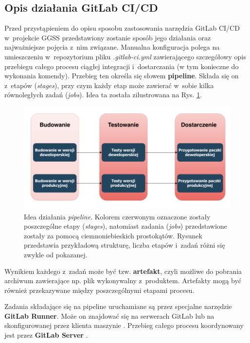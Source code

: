 \subsection{Opis działania GitLab CI/CD}
Przed przystąpieniem do opisu sposobu zastosowania narzędzia GitLab CI/CD w~projekcie GGSS przedstawiony zostanie sposób jego działania oraz najważniejsze pojęcia z~nim związane. Manualna konfiguracja polega na umieszczeniu w~repozytorium pliku \textit{.gitlab-ci.yml} zawierającego szczegółowy opis przebiegu całego procesu ciągłej integracji i~dostarczania (w tym konieczne do wykonania komendy). Przebieg ten określa się słowem \textbf{pipeline}. Składa się on z~etapów (\textit{stages}), przy czym każdy etap może zawierać w~sobie kilka równoległych zadań (\textit{jobs}). Idea ta została zilustrowana na Rys. \ref{fig:pipeline}.

\begin{figure}
\centering
\includegraphics[width=\textwidth]{res/Pipeline.pdf}
\caption{Idea działania \textit{pipeline}. Kolorem czerwonym oznaczone zostały poszczególne etapy (\textit{stages}), natomiast zadania (\textit{jobs}) przedstawione zostały za pomocą ciemnoniebieskich prostokątów. Rysunek przedstawia przykładową strukturę, liczba etapów i~zadań różni się zwykle od pokazanej.}
\label{fig:pipeline}
\end{figure}

Wynikiem każdego z~zadań może być tzw. \textbf{artefakt}, czyli możliwe do pobrania archiwum zawierające np. plik wykonywalny z~produktem. Artefakty mogą być również przekazywane między poszczególnymi etapami procesu. 

Zadania składające się na pipeline uruchamiane są przez specjalne narzędzie \textbf{GitLab Runner}. Może on znajdować się na serwerach GitLab lub na skonfigurowanej przez klienta maszynie \cite{CIzGitLab}. Przebieg całego procesu koordynowany jest przez \textbf{GitLab Server} \cite{GitLabPage}.

